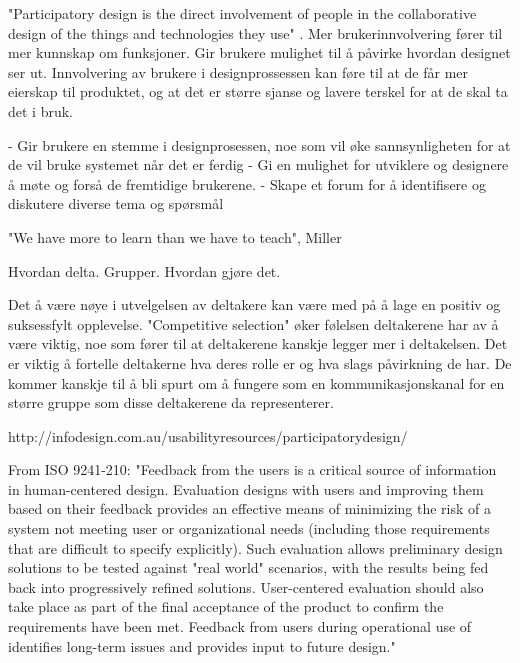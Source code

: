 "Participatory design is the direct involvement of people in the collaborative design of the things and technologies they use" \cite{mmi}. Mer brukerinnvolvering fører til mer kunnskap om funksjoner. Gir brukere mulighet til å påvirke hvordan designet ser ut. Innvolvering av brukere i designprossessen kan føre til at de får mer eierskap til produktet, og at det er større sjanse og lavere terskel for at de skal ta det i bruk.

- Gir brukere en stemme i designprosessen, noe som vil øke sannsynligheten for at de vil bruke systemet når det er ferdig 
- Gi en mulighet for utviklere og designere å møte og forså de fremtidige brukerene. 
- Skape et forum for å identifisere og diskutere diverse tema og spørsmål

"We have more to learn than we have to teach", Miller

Hvordan delta. Grupper. Hvordan gjøre det. 

Det å være nøye i utvelgelsen av deltakere kan være med på å lage en positiv og suksessfylt opplevelse. "Competitive selection" øker følelsen deltakerene har av å være viktig, noe som fører til at deltakerene kanskje legger mer i deltakelsen. Det er viktig å fortelle deltakerne hva deres rolle er og hva slags påvirkning de har. De kommer kanskje til å bli spurt om å fungere som en kommunikasjonskanal for en større gruppe som disse deltakerene da representerer. 

http://infodesign.com.au/usabilityresources/participatorydesign/

From ISO 9241-210:
"Feedback from the users is a critical source of information in human-centered design. Evaluation designs with users and improving them based on their feedback provides an effective means of minimizing the risk of a system not meeting user or organizational needs (including those requirements that are difficult to specify explicitly). Such evaluation allows preliminary design solutions to be tested against "real world" scenarios, with the results being fed back into progressively refined solutions. User-centered evaluation should also take place as part of the final acceptance of the product to confirm the requirements have been met. Feedback from users during operational use of identifies long-term issues and provides input to future design."




